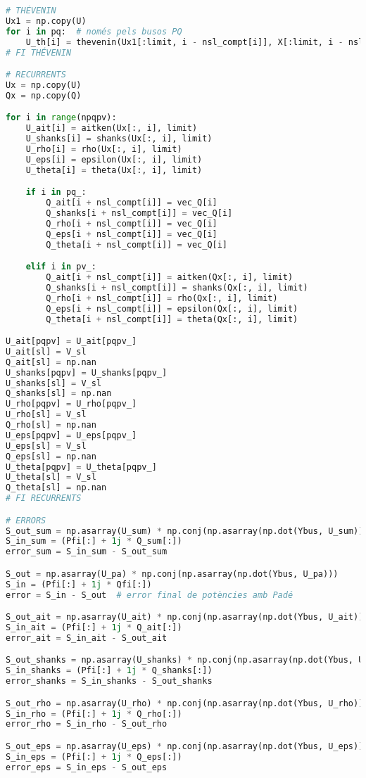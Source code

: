 \begin{lstlisting}[language=Python,numbers=none]
# THÉVENIN
Ux1 = np.copy(U)
for i in pq:  # només pels busos PQ
    U_th[i] = thevenin(Ux1[:limit, i - nsl_compt[i]], X[:limit, i - nsl_compt[i]])
# FI THÉVENIN

# RECURRENTS
Ux = np.copy(U)
Qx = np.copy(Q)

for i in range(npqpv):
    U_ait[i] = aitken(Ux[:, i], limit)
    U_shanks[i] = shanks(Ux[:, i], limit)
    U_rho[i] = rho(Ux[:, i], limit)
    U_eps[i] = epsilon(Ux[:, i], limit)
    U_theta[i] = theta(Ux[:, i], limit)

    if i in pq_:
        Q_ait[i + nsl_compt[i]] = vec_Q[i]
        Q_shanks[i + nsl_compt[i]] = vec_Q[i]
        Q_rho[i + nsl_compt[i]] = vec_Q[i]
        Q_eps[i + nsl_compt[i]] = vec_Q[i]
        Q_theta[i + nsl_compt[i]] = vec_Q[i]

    elif i in pv_:
        Q_ait[i + nsl_compt[i]] = aitken(Qx[:, i], limit)
        Q_shanks[i + nsl_compt[i]] = shanks(Qx[:, i], limit)
        Q_rho[i + nsl_compt[i]] = rho(Qx[:, i], limit)
        Q_eps[i + nsl_compt[i]] = epsilon(Qx[:, i], limit)
        Q_theta[i + nsl_compt[i]] = theta(Qx[:, i], limit)

U_ait[pqpv] = U_ait[pqpv_]
U_ait[sl] = V_sl
Q_ait[sl] = np.nan
U_shanks[pqpv] = U_shanks[pqpv_]
U_shanks[sl] = V_sl
Q_shanks[sl] = np.nan
U_rho[pqpv] = U_rho[pqpv_]
U_rho[sl] = V_sl
Q_rho[sl] = np.nan
U_eps[pqpv] = U_eps[pqpv_]
U_eps[sl] = V_sl
Q_eps[sl] = np.nan
U_theta[pqpv] = U_theta[pqpv_]
U_theta[sl] = V_sl
Q_theta[sl] = np.nan
# FI RECURRENTS

# ERRORS
S_out_sum = np.asarray(U_sum) * np.conj(np.asarray(np.dot(Ybus, U_sum)))
S_in_sum = (Pfi[:] + 1j * Q_sum[:])
error_sum = S_in_sum - S_out_sum

S_out = np.asarray(U_pa) * np.conj(np.asarray(np.dot(Ybus, U_pa)))
S_in = (Pfi[:] + 1j * Qfi[:])
error = S_in - S_out  # error final de potències amb Padé

S_out_ait = np.asarray(U_ait) * np.conj(np.asarray(np.dot(Ybus, U_ait)))
S_in_ait = (Pfi[:] + 1j * Q_ait[:])
error_ait = S_in_ait - S_out_ait

S_out_shanks = np.asarray(U_shanks) * np.conj(np.asarray(np.dot(Ybus, U_shanks)))
S_in_shanks = (Pfi[:] + 1j * Q_shanks[:])
error_shanks = S_in_shanks - S_out_shanks

S_out_rho = np.asarray(U_rho) * np.conj(np.asarray(np.dot(Ybus, U_rho)))
S_in_rho = (Pfi[:] + 1j * Q_rho[:])
error_rho = S_in_rho - S_out_rho

S_out_eps = np.asarray(U_eps) * np.conj(np.asarray(np.dot(Ybus, U_eps)))
S_in_eps = (Pfi[:] + 1j * Q_eps[:])
error_eps = S_in_eps - S_out_eps


\end{lstlisting}
